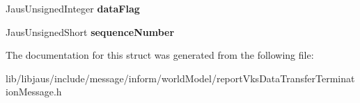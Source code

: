 \begin{DoxyCompactItemize}
\item 
\hypertarget{struct_report_vks_data_transfer_termination_message_struct_ae882d06fa03041ad8e1ae2662f693d6c}{\-Jaus\-Unsigned\-Integer {\bfseries data\-Flag}}\label{struct_report_vks_data_transfer_termination_message_struct_ae882d06fa03041ad8e1ae2662f693d6c}

\item 
\hypertarget{struct_report_vks_data_transfer_termination_message_struct_a5d75e0c6ecd1194e44d2d69e5c992827}{\-Jaus\-Unsigned\-Short {\bfseries sequence\-Number}}\label{struct_report_vks_data_transfer_termination_message_struct_a5d75e0c6ecd1194e44d2d69e5c992827}

\end{DoxyCompactItemize}


\-The documentation for this struct was generated from the following file\-:\begin{DoxyCompactItemize}
\item 
lib/libjaus/include/message/inform/world\-Model/report\-Vks\-Data\-Transfer\-Termination\-Message.\-h\end{DoxyCompactItemize}

